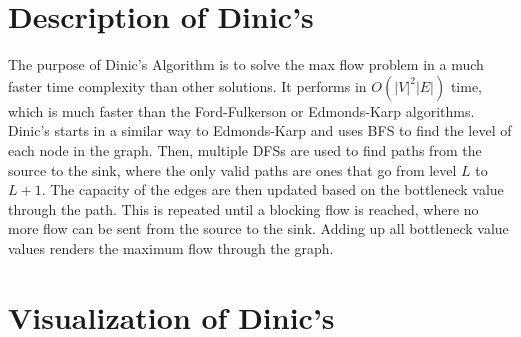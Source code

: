 \documentclass{report}
\begin{document}
\section{Description of Dinic's}
The purpose of Dinic's Algorithm is to solve the max flow problem in a much faster time complexity than other solutions. It performs in $O\left(|V|^{2}|E|\right)$ time, which is much faster than the Ford-Fulkerson or Edmonds-Karp algorithms. Dinic's starts in a similar way to Edmonds-Karp and uses BFS to find the level of each node in the graph. Then, multiple DFSs are used to find paths from the source to the sink, where the only valid paths are ones that go from level $L$ to $L + 1$. The capacity of the edges are then updated based on the bottleneck value through the path. This is repeated until a blocking flow is reached, where no more flow can be sent from the source to the sink. Adding up all bottleneck value values renders the maximum flow through the graph.

\pagebreak

\section{Visualization of Dinic's}
\end{document}
